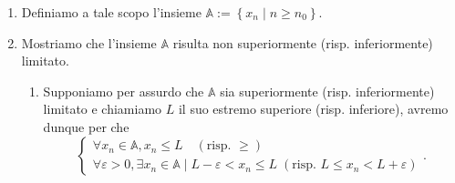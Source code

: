 \begin{demonstration}
\begin{enumerate}[label=(\roman*)]
\begin{enumerate}[label=\arabic*.]
            \item Definiamo a tale scopo l'insieme $\mathbb{A} := \left\{x_n\mid n\geq n_0\right\}$.

            \item Mostriamo che l'insieme $\mathbb{A}$ risulta non superiormente (risp. inferiormente) limitato.
            \begin{enumerate}[label=\arabic{enumii}.\arabic*.]
                \item Supponiamo per assurdo che $\mathbb{A}$ sia superiormente (risp. inferiormente) limitato
                e chiamiamo $L$ il suo estremo superiore (risp. inferiore), avremo dunque per  che
                \[
                    \begin{cases}
                        \forall x_n\in\mathbb{A}, x_n \leq L  \quad \left(\text{risp. }\geq\right)\\
                        \forall \varepsilon > 0, \exists x_n\in\mathbb{A} \mid L-\varepsilon<x_n\leq L \; \left(\text{risp. }L\leq x_n< L+\varepsilon\right)
                    \end{cases}.
                \]
                    

\end{enumerate}
\end{enumerate}
\end{enumerate}
\end{demonstration}
